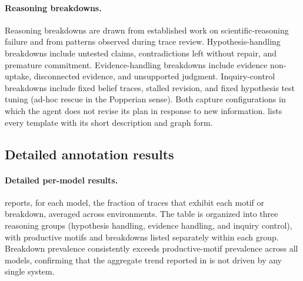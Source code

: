 \paragraph{Reasoning breakdowns.} Reasoning breakdowns are drawn from established work on scientific-reasoning failure and from patterns observed during trace review. Hypothesis-handling breakdowns include untested claims, contradictions left without repair, and premature commitment. Evidence-handling breakdowns include evidence non-uptake, disconnected evidence, and unsupported judgment. Inquiry-control breakdowns include fixed belief traces, stalled revision, and fixed hypothesis test tuning (ad-hoc rescue in the Popperian sense). Both capture configurations in which the agent does not revise its plan in response to new information.  lists every template with its short description and graph form.

\begin{table}[H]
    \centering
    \caption{\textbf{Definitions and graphs illustrating the different reasoning breakdowns.} Each pattern is detailed as a graph and a short description. Note that \textit{untested hypothesis}, \textit{unused evidence}, and \textit{absent/stalled revision} include two different graphs per pattern, which are different cases of the same breakdown.}
    \label{tab:reas-break-def}
    
\end{table}

\subsection{Detailed annotation results}

\paragraph{Detailed per-model results.}  reports, for each model, the fraction of traces that exhibit each motif or breakdown, averaged across environments. The table is organized into three reasoning groups (hypothesis handling, evidence handling, and inquiry control), with productive motifs and breakdowns listed separately within each group. Breakdown prevalence consistently exceeds productive-motif prevalence across all models, confirming that the aggregate trend reported in  is not driven by any single system.

\begin{table}[H]
    \centering
    \caption{\textbf{Detailed pattern presence for the epistemological analysis}. The table presents the percentages for each model included in our work, averaged across environments.}
    \label{tab:epist-full-scores}
    
\end{table}

